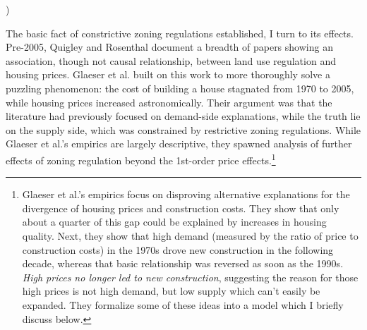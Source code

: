 )\documentclass{article}[11pt]
\begin{document}
The basic fact of constrictive zoning regulations established, I turn to its effects. Pre-2005, Quigley and Rosenthal document a breadth of papers showing an association, though not causal relationship, between land use regulation and housing prices. \citep{quigley2005effects} Glaeser et al. built on this work to more thoroughly solve a puzzling phenomenon: the cost of building a house stagnated from 1970 to 2005, while housing prices increased astronomically. \citep{glaeser2005empirical} Their argument was that the literature had previously focused on demand-side explanations, while the truth lie on the supply side, which was constrained by restrictive zoning regulations. While Glaeser et al.'s empirics are largely descriptive, they spawned analysis of further effects of zoning regulation beyond the 1st-order price effects.\footnote{Glaeser et al.'s empirics focus on disproving alternative explanations for the divergence of housing prices and construction costs. They show that only about a quarter of this gap could be explained by increases in housing quality. Next, they show that high demand (measured by the ratio of price to construction costs) in the 1970s drove new construction in the following decade, whereas that basic relationship was reversed as soon as the 1990s. \textit{High prices no longer led to new construction}, suggesting the reason for those high prices is not high demand, but low supply which can't easily be expanded. They formalize some of these ideas into a model which I briefly discuss below.} 
\end{document}
